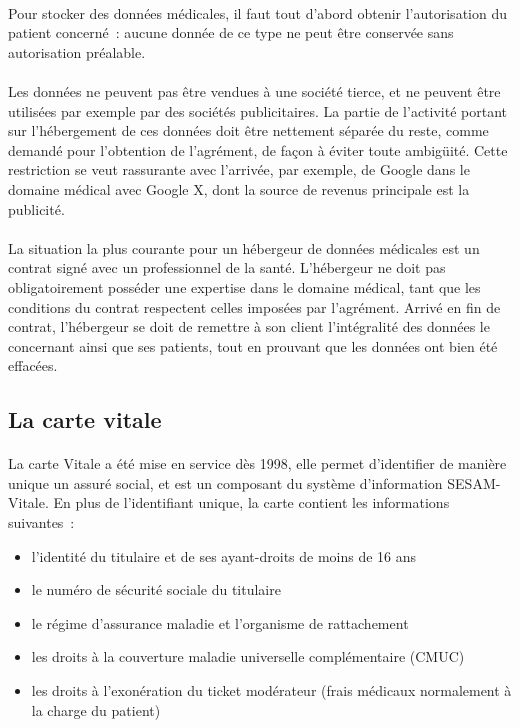 \paragraph{}
Pour stocker des données médicales, il faut tout d'abord obtenir l'autorisation
du patient concerné~: aucune donnée de ce type ne peut être conservée sans
autorisation préalable.

\paragraph{}
Les données ne peuvent pas être vendues à une société tierce, et ne peuvent
être utilisées par exemple par des sociétés publicitaires. La partie de
l'activité portant sur l'hébergement de ces données doit être nettement séparée
du reste, comme demandé pour l'obtention de l'agrément, de façon à éviter toute
ambigüité. Cette restriction se veut rassurante avec l'arrivée, par exemple, de
Google dans le domaine médical avec Google X, dont la source de revenus
principale est la publicité.

\paragraph{}
La situation la plus courante pour un hébergeur de données médicales est un
contrat signé avec un professionnel de la santé. L'hébergeur ne doit pas
obligatoirement posséder une expertise dans le domaine médical, tant que les
conditions du contrat respectent celles imposées par l'agrément. Arrivé en fin
de contrat, l'hébergeur se doit de remettre à son client l'intégralité des
données le concernant ainsi que ses patients, tout en prouvant que les données
ont bien été effacées.


        \subsection{La carte vitale}

\paragraph{}
La carte Vitale a été mise en service dès 1998, elle permet d'identifier de
manière unique un assuré social, et est un composant du système
d'information SESAM-Vitale. En plus de l'identifiant unique, la carte
contient les informations suivantes~:

\begin{itemize}
    \item l'identité du titulaire et de ses ayant-droits de moins de 16 ans
    \item le numéro de sécurité sociale du titulaire
    \item le régime d'assurance maladie et l'organisme de rattachement
    \item les droits à la couverture maladie universelle complémentaire (CMUC)
    \item les droits à l'exonération du ticket modérateur (frais médicaux normalement à la charge du patient)
\end{itemize}

